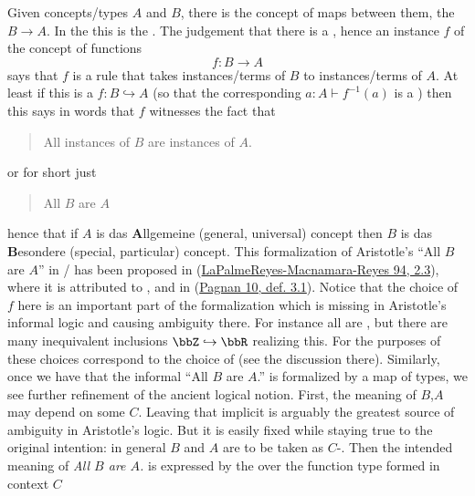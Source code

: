 \documentclass[12pt,titlepage]{article}
\theoremstyle{plain}
\theoremstyle{definition}
\theoremstyle{remark}
\begin{document}
Given concepts/types $A$ and $B$, there is the concept of maps between them, the  $B\to A$. In the  this is the .
The judgement that there is a , hence an instance $f$ of the concept of functions
\begin{displaymath}
f \colon B \longrightarrow A
\end{displaymath}
says that $f$ is a rule that takes instances/terms of $B$ to instances/terms of $A$. At least if this is a  $f \colon B \hookrightarrow A$ (so that the corresponding $a\colon A \vdash f^{-1}(a)$ is a ) then this says in words that $f$ witnesses the fact that
\begin{quote}%
All instances of $B$ are instances of $A$.
\end{quote}
or for short just
\begin{quote}%
All $B$ are $A$
\end{quote}
hence that if $A$ is das \textbf{A}llgemeine (general, universal) concept then $B$ is das \textbf{B}esondere (special, particular) concept.
This formalization of Aristotle's ``All $B$ are $A$'' in / has been proposed in (\hyperlink{PalmeReyesMacnamaraReyes94}{LaPalmeReyes-Macnamara-Reyes 94, 2.3}), where it is attributed to , and in (\hyperlink{Pagnan10}{Pagnan 10, def. 3.1}).
Notice that the choice of $f$ here is an important part of the formalization which is missing in Aristotle's informal logic and causing ambiguity there.
For instance all  are , but there are many inequivalent  inclusions $\bbZ\hookrightarrow \bbR$ realizing this. For the purposes of  these choices correspond to the choice of  (see the discussion there).
Similarly, once we have that the informal ``All $B$ are $A$.'' is formalized by a map of types, we see further refinement of the ancient logical notion.
First, the meaning of $B$,$A$ may depend on some  $C$. Leaving that implicit is arguably the greatest source of ambiguity in Aristotle's logic. But it is easily fixed while staying true to the original intention: in general $B$ and $A$ are to be taken as $C$-. Then the intended meaning of \emph{All $B$ are $A$.} is expressed by the  over the function type formed in context $C$
\end{document}
